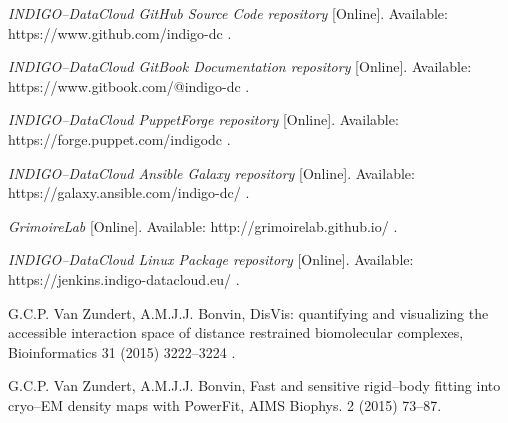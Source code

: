 \documentclass[journal]{IEEEtran}
\begin{document}
\begin{thebibliography}{1}
\emph{INDIGO--DataCloud GitHub Source Code repository} [Online]. Available:
https://www.github.com/indigo-dc .

\emph{INDIGO--DataCloud GitBook Documentation repository} [Online]. Available:
https://www.gitbook.com/@indigo-dc .

\emph{INDIGO--DataCloud PuppetForge repository} [Online]. Available:
https://forge.puppet.com/indigodc .

\emph{INDIGO--DataCloud Ansible Galaxy repository} [Online]. Available:
https://galaxy.ansible.com/indigo-dc/ .

\emph{GrimoireLab} [Online]. Available: http://grimoirelab.github.io/ .

\emph{INDIGO--DataCloud Linux Package repository} [Online]. Available: https://jenkins.indigo-datacloud.eu/ .

 G.C.P. Van Zundert, A.M.J.J. Bonvin,
DisVis: quantifying and visualizing the accessible interaction space of distance
restrained biomolecular complexes, Bioinformatics 31 (2015) 3222--3224 .

 G.C.P. Van Zundert, A.M.J.J. Bonvin,
Fast and sensitive rigid--body fitting into cryo--EM density maps with PowerFit,
AIMS Biophys. 2 (2015) 73--87.

\end{thebibliography}
\end{document}
